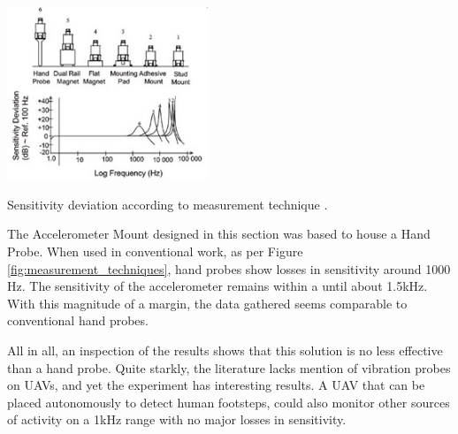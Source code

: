     \begin{marginfigure}%
      \includegraphics[width=6cm]{images/stage_graphs/accelero_ref.jpg}
      \caption{ Sensitivity deviation according to measurement technique \cite{safe_load_testing_technologies_2021}.}
      \label{fig:measurement_techniques}
    \end{marginfigure}
    
    
The Accelerometer Mount designed in this section was based to house a Hand Probe. When used in conventional work, as per Figure \ref{fig:measurement_techniques}, hand probes show losses in sensitivity around 1000 Hz. The sensitivity of the accelerometer remains within a  until about 1.5kHz. With this magnitude of a margin, the data gathered seems comparable to conventional hand probes. 

    

    
All in all, an inspection of the results shows that this solution is no less effective than a hand probe. Quite starkly, the literature lacks mention of vibration probes on UAVs, and yet the experiment has interesting results. A UAV that can be placed autonomously to detect human footsteps, could also monitor other sources of activity on a 1kHz range with no major losses in sensitivity.



